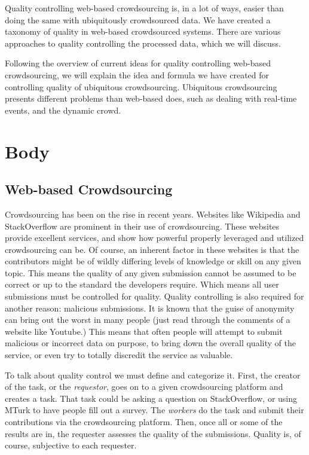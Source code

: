 \documentclass{sig-alternate-05-2015}
\begin{document}
	Quality controlling web-based crowdsourcing is, in a lot of ways, easier than doing the same with ubiquitously crowdsourced data. We have created a taxonomy of quality in web-based crowdsourced systems. There are various approaches to quality controlling the processed data, which we will discuss.
	
	Following the overview of current ideas for quality controlling web-based crowdsourcing, we will explain the idea and formula we have created for controlling quality of ubiquitous crowdsourcing. Ubiquitous crowdsourcing presents different problems than web-based does, such as dealing with real-time events, and the dynamic crowd. 
	
	\section{Body}	
	\subsection{Web-based Crowdsourcing}
		
	Crowdsourcing has been on the rise in recent years. Websites like Wikipedia and StackOverflow are prominent in their use of crowdsourcing. These websites provide excellent services, and show how powerful properly leveraged and utilized crowdsourcing can be. Of course, an inherent factor in these websites is that the contributors might be of wildly differing levels of knowledge or skill on any given topic. This means the quality of any given submission cannot be assumed to be correct or up to the standard the developers require. Which means all user submissions must be controlled for quality. Quality controlling is also required for another reason: malicious submissions. It is known that the guise of anonymity can bring out the worst in many people (just read through the comments of a website like Youtube.) This means that often people will attempt to submit malicious or incorrect data on purpose, to bring down the overall quality of the service, or even try to totally discredit the service as valuable.
	
	To talk about quality control we must define and categorize it. First, the creator of the task, or the \emph{requestor}, goes on to a given crowdsourcing platform and creates a task. That task could be asking a question on StackOverflow, or using MTurk to have people fill out a survey. The \emph{workers} do the task and submit their contributions via the crowdsourcing platform. Then, once all or some of the results are in, the requester assesses the quality of the submissions. Quality is, of course, subjective to each requester. 
	
\end{document}
